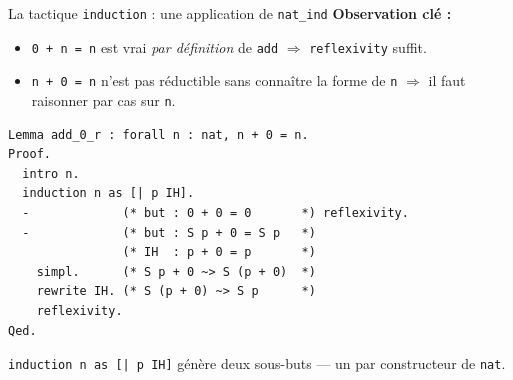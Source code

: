 \documentclass[aspectratio=169]{beamer}
\begin{document}
\begin{frame}[fragile]{La tactique \texttt{induction} : une application de \texttt{nat\_ind}}
  \textbf{Observation clé :}
  \begin{itemize}
    \item \texttt{0 + n = n} est vrai \emph{par définition} de \texttt{add} $\Rightarrow$ \texttt{reflexivity} suffit.
    \item \texttt{n + 0 = n} n'est pas réductible sans connaître la forme de \texttt{n} $\Rightarrow$ il faut raisonner par cas sur \texttt{n}.
  \end{itemize}
  \pause
  \medskip
\begin{verbatim}
Lemma add_0_r : forall n : nat, n + 0 = n.
Proof.
  intro n.
  induction n as [| p IH].
  -             (* but : 0 + 0 = 0       *) reflexivity.
  -             (* but : S p + 0 = S p   *)
                (* IH  : p + 0 = p       *)
    simpl.      (* S p + 0 ~> S (p + 0)  *)
    rewrite IH. (* S (p + 0) ~> S p      *)
    reflexivity.
Qed.
\end{verbatim}
  \texttt{induction n as [| p IH]} génère deux sous-buts — un par constructeur de \texttt{nat}.
\end{frame}
\end{document}

